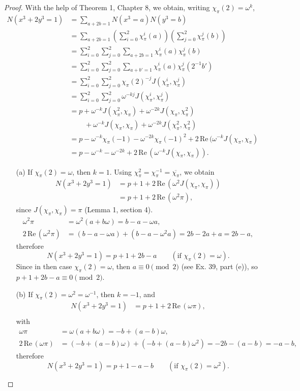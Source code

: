 \documentclass[11pt,a4paper]{article}
\newcommand{\re}{\,\mathrm{Re}\,}
\begin{document}
\begin{proof}
With the help of Theorem 1, Chapter 8, we obtain, writing $\chi_\pi(2) = \omega^k$,
\begin{align*}
N(x^3 + 2 y^3 = 1)&= \sum_{a+2b = 1} N(x^3 =a) N(y^3 = b)\\
&=\sum_{a+2b = 1} \left(\sum_{i=0}^2 \chi_\pi^i(a)\right)\left( \sum_{j=0}^2 \chi_\pi^j(b)\right)\\
&=\sum_{i=0}^2\sum_{j=0}^2 \sum_{a+2b=1} \chi_\pi^i(a)\chi_\pi^j(b)\\
&=\sum_{i=0}^2\sum_{j=0}^2  \sum_{a+b' = 1} \chi_\pi^i(a) \chi_\pi^j(2^{-1} b')\\
&=\sum_{i=0}^2\sum_{j=0}^2 \chi_\pi(2)^{-j} J(\chi_\pi^i, \chi_\pi^j)\\
&=\sum_{i=0}^2\sum_{j=0}^2 \omega^{-kj} J(\chi_\pi^i, \chi_\pi^j)\\
&= p + \omega^{-k} J(\chi_\pi^2,\chi_\pi) + \omega^{-2k} J(\chi_\pi,\chi_\pi^2)\\
&\phantom{= p .} + \omega^{-k} J(\chi_\pi, \chi_\pi) + \omega^{-2k} J(\chi_\pi^2, \chi_\pi^2)\\
&=p - \omega^{-k} \chi_\pi(-1) - \omega^{-2k} \chi_\pi(-1)^2 + 2 \re(\omega^{-k} J(\chi_\pi,\chi_\pi)\\
&= p - \omega^{-k} -  \omega^{-2k} +  2 \re(\omega^{-k} J(\chi_\pi,\chi_\pi)).
\end{align*}

\begin{enumerate}

\item[(a)] If $\chi_\pi(2) = \omega$, then $k=1$. Using $\chi_\pi^2 = \chi_\pi^{-1} =\overline{\chi_\pi}$, we obtain
\begin{align*}
N(x^3 + 2 y^3 = 1)&= p+1+ 2 \re(\omega^{2} J(\chi_\pi,\chi_\pi))\\
&=p+1 + 2 \re(\omega^2 \pi),
\end{align*}
since $J(\chi_\pi,\chi_\pi) = \pi$ (Lemma 1, section 4).
\begin{align*}
\omega^2\pi &= \omega^2(a + b \omega) = b - a -\omega a,\\
2 \re(\omega^2\pi) &= (b-a -\omega a) + (b - a - \omega^2 a) = 2b-2a + a = 2b-a,
\end{align*}
therefore
$$N(x^3 + 2 y^3 = 1) = p+1 + 2b -a\qquad (\text{if }\chi_\pi(2) = \omega).$$
Since in then case $\chi_\pi(2) = \omega$, then $a \equiv 0 \pmod 2$ (see Ex. 39, part (e)), so $p + 1 + 2b -a \equiv 0 \pmod 2$.

(b) If $\chi_\pi(2) = \omega^2 = \omega^{-1}$, then $k=-1$, and
\begin{align*}
N(x^3 + 2 y^3 = 1)&= p+1+ 2 \re(\omega \pi),\\
\end{align*}
with 
\begin{align*}
\omega \pi &= \omega (a + b \omega) = -b + (a-b)\omega,\\
2 \re(\omega \pi) &= (-b + (a-b) \omega) +( -b + (a-b)\omega^2) = -2b - (a-b) = -a -b,
\end{align*}
therefore
$$N(x^3 + 2y^3 = 1) = p+1 -a-b \qquad (\text {if }\chi_\pi(2) = \omega^2).$$



\end{enumerate}
\end{proof}
\end{document}
